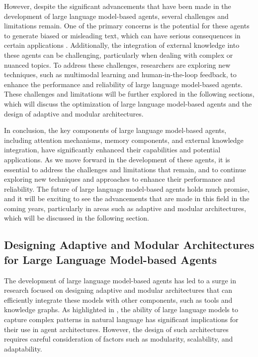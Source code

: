 \documentclass[11pt,a4paper]{article}
\begin{document}
However, despite the significant advancements that have been made in the development of large language model-based agents, several challenges and limitations remain. One of the primary concerns is the potential for these agents to generate biased or misleading text, which can have serious consequences in certain applications \cite{arxiv:2410.02644}. Additionally, the integration of external knowledge into these agents can be challenging, particularly when dealing with complex or nuanced topics. To address these challenges, researchers are exploring new techniques, such as multimodal learning and human-in-the-loop feedback, to enhance the performance and reliability of large language model-based agents. These challenges and limitations will be further explored in the following sections, which will discuss the optimization of large language model-based agents and the design of adaptive and modular architectures.

In conclusion, the key components of large language model-based agents, including attention mechanisms, memory components, and external knowledge integration, have significantly enhanced their capabilities and potential applications. As we move forward in the development of these agents, it is essential to address the challenges and limitations that remain, and to continue exploring new techniques and approaches to enhance their performance and reliability. The future of large language model-based agents holds much promise, and it will be exciting to see the advancements that are made in this field in the coming years, particularly in areas such as adaptive and modular architectures, which will be discussed in the following section.


\subsection{Designing Adaptive and Modular Architectures for Large Language Model-based Agents}


The development of large language model-based agents has led to a surge in research focused on designing adaptive and modular architectures that can efficiently integrate these models with other components, such as tools and knowledge graphs. As highlighted in \cite{arxiv:1906.09379}, the ability of large language models to capture complex patterns in natural language has significant implications for their use in agent architectures. However, the design of such architectures requires careful consideration of factors such as modularity, scalability, and adaptability.
\end{document}
